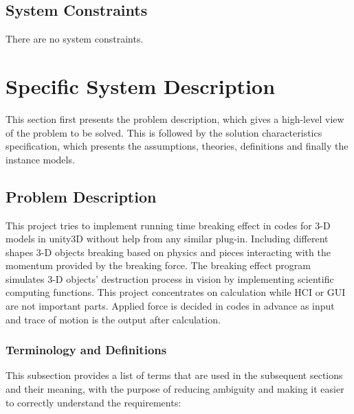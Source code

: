 \documentclass[12pt]{article}
\begin{document}
\subsection{System Constraints}

There are no system constraints.  

\section{Specific System Description}

This section first presents the problem description, which gives a high-level
view of the problem to be solved.  This is followed by the solution characteristics
specification, which presents the assumptions, theories, definitions and finally
the instance models. 

\subsection{Problem Description} \label{Sec_pd}

This project tries to implement running time breaking effect in codes for 3-D models in unity3D without help from any similar plug-in. Including different shapes 3-D objects breaking based on physics and pieces interacting with the momentum provided by the breaking force. The breaking effect program simulates 3-D objects’ destruction process in vision by implementing scientific computing functions. This project concentrates on calculation while HCI or GUI are not important parts. Applied force is decided in codes in advance as input and trace of motion is the output after calculation.

\subsubsection{Terminology and  Definitions}

This subsection provides a list of terms that are used in the subsequent
sections and their meaning, with the purpose of reducing ambiguity and making it
easier to correctly understand the requirements:
\end{document}
